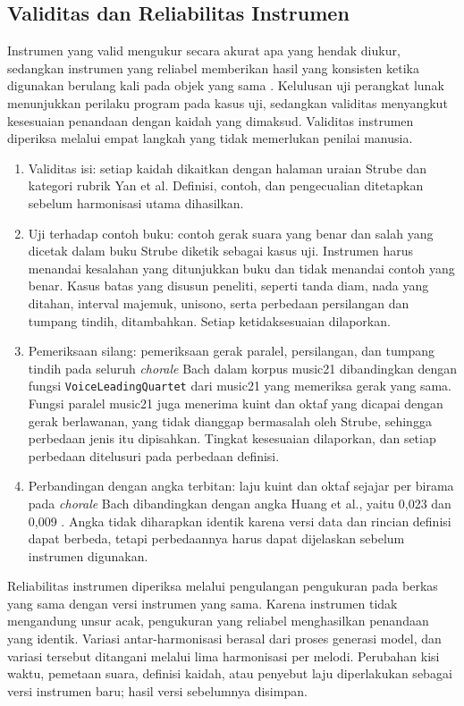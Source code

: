 \subsection{Validitas dan Reliabilitas Instrumen}

Instrumen yang valid mengukur secara akurat apa yang hendak diukur, sedangkan instrumen yang reliabel memberikan hasil yang konsisten ketika digunakan berulang kali pada objek yang sama \parencite{leedy2018}. Kelulusan uji perangkat lunak menunjukkan perilaku program pada kasus uji, sedangkan validitas menyangkut kesesuaian penandaan dengan kaidah yang dimaksud. Validitas instrumen diperiksa melalui empat langkah yang tidak memerlukan penilai manusia.

\begin{enumerate}
    \item Validitas isi: setiap kaidah dikaitkan dengan halaman uraian Strube dan kategori rubrik Yan et al. Definisi, contoh, dan pengecualian ditetapkan sebelum harmonisasi utama dihasilkan.
    \item Uji terhadap contoh buku: contoh gerak suara yang benar dan salah yang dicetak dalam buku Strube diketik sebagai kasus uji. Instrumen harus menandai kesalahan yang ditunjukkan buku dan tidak menandai contoh yang benar. Kasus batas yang disusun peneliti, seperti tanda diam, nada yang ditahan, interval majemuk, unisono, serta perbedaan persilangan dan tumpang tindih, ditambahkan. Setiap ketidaksesuaian dilaporkan.
    \item Pemeriksaan silang: pemeriksaan gerak paralel, persilangan, dan tumpang tindih pada seluruh \textit{chorale} Bach dalam korpus music21 dibandingkan dengan fungsi \texttt{VoiceLeadingQuartet} dari music21 yang memeriksa gerak yang sama. Fungsi paralel music21 juga menerima kuint dan oktaf yang dicapai dengan gerak berlawanan, yang tidak dianggap bermasalah oleh Strube, sehingga perbedaan jenis itu dipisahkan. Tingkat kesesuaian dilaporkan, dan setiap perbedaan ditelusuri pada perbedaan definisi.
    \item Perbandingan dengan angka terbitan: laju kuint dan oktaf sejajar per birama pada \textit{chorale} Bach dibandingkan dengan angka Huang et al., yaitu 0,023 dan 0,009 \parencite{huang2019}. Angka tidak diharapkan identik karena versi data dan rincian definisi dapat berbeda, tetapi perbedaannya harus dapat dijelaskan sebelum instrumen digunakan.
\end{enumerate}

Reliabilitas instrumen diperiksa melalui pengulangan pengukuran pada berkas yang sama dengan versi instrumen yang sama. Karena instrumen tidak mengandung unsur acak, pengukuran yang reliabel menghasilkan penandaan yang identik. Variasi antar-harmonisasi berasal dari proses generasi model, dan variasi tersebut ditangani melalui lima harmonisasi per melodi. Perubahan kisi waktu, pemetaan suara, definisi kaidah, atau penyebut laju diperlakukan sebagai versi instrumen baru; hasil versi sebelumnya disimpan.

